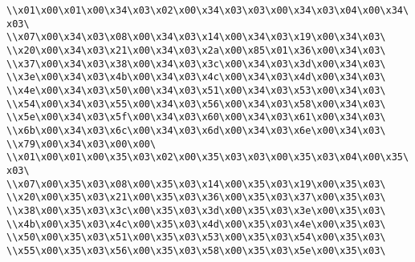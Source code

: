 \verb|\\x01\x00\x01\x00\x34\x03\x02\x00\x34\x03\x03\x00\x34\x03\x04\x00\x34\x03\|\newline
\verb|\\x07\x00\x34\x03\x08\x00\x34\x03\x14\x00\x34\x03\x19\x00\x34\x03\|\newline
\verb|\\x20\x00\x34\x03\x21\x00\x34\x03\x2a\x00\x85\x01\x36\x00\x34\x03\|\newline
\verb|\\x37\x00\x34\x03\x38\x00\x34\x03\x3c\x00\x34\x03\x3d\x00\x34\x03\|\newline
\verb|\\x3e\x00\x34\x03\x4b\x00\x34\x03\x4c\x00\x34\x03\x4d\x00\x34\x03\|\newline
\verb|\\x4e\x00\x34\x03\x50\x00\x34\x03\x51\x00\x34\x03\x53\x00\x34\x03\|\newline
\verb|\\x54\x00\x34\x03\x55\x00\x34\x03\x56\x00\x34\x03\x58\x00\x34\x03\|\newline
\verb|\\x5e\x00\x34\x03\x5f\x00\x34\x03\x60\x00\x34\x03\x61\x00\x34\x03\|\newline
\verb|\\x6b\x00\x34\x03\x6c\x00\x34\x03\x6d\x00\x34\x03\x6e\x00\x34\x03\|\newline
\verb|\\x79\x00\x34\x03\x00\x00\|\newline
\verb|\\x01\x00\x01\x00\x35\x03\x02\x00\x35\x03\x03\x00\x35\x03\x04\x00\x35\x03\|\newline
\verb|\\x07\x00\x35\x03\x08\x00\x35\x03\x14\x00\x35\x03\x19\x00\x35\x03\|\newline
\verb|\\x20\x00\x35\x03\x21\x00\x35\x03\x36\x00\x35\x03\x37\x00\x35\x03\|\newline
\verb|\\x38\x00\x35\x03\x3c\x00\x35\x03\x3d\x00\x35\x03\x3e\x00\x35\x03\|\newline
\verb|\\x4b\x00\x35\x03\x4c\x00\x35\x03\x4d\x00\x35\x03\x4e\x00\x35\x03\|\newline
\verb|\\x50\x00\x35\x03\x51\x00\x35\x03\x53\x00\x35\x03\x54\x00\x35\x03\|\newline
\verb|\\x55\x00\x35\x03\x56\x00\x35\x03\x58\x00\x35\x03\x5e\x00\x35\x03\|\newline
